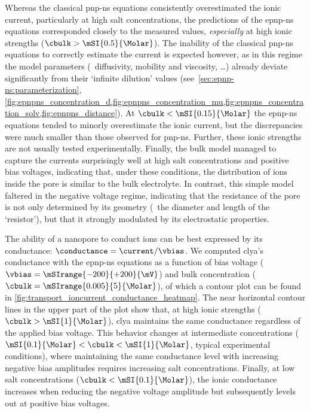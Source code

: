 Whereas the classical \gls{pnp-ns} equations consistently overestimated the ionic current, particularly at
high salt concentrations, the predictions of the \gls{epnp-ns} equations corresponded closely to the measured
values, \emph{especially} at high ionic strengths ($\cbulk > \mSI{0.5}{\Molar}$). The inability of the
classical \gls{pnp-ns} equations to correctly estimate the current is expected however, as in this regime the
model parameters (\eg~diffusivity, mobility and viscosity, \ldots) already deviate significantly from their
`infinite dilution' values (see~\cref{sec:epnp-ns:parameterization},
\cref{fig:epnpns_concentration_d,fig:epnpns_concentration_mu,fig:epnpns_concentration_solv,fig:epnpns_distance}).
At $\cbulk < \mSI{0.15}{\Molar}$ the \gls{epnp-ns} equations tended to minorly overestimate the ionic current,
but the discrepancies were much smaller than those observed for \gls{pnp-ns}. Further, these ionic strengths
are not usually tested experimentally. Finally, the bulk model managed to capture the currents surprisingly
well at high salt concentrations and positive bias voltages, indicating that, under these conditions, the
distribution of ions inside the pore is similar to the bulk electrolyte. In contrast, this simple model
faltered in the negative voltage regime, indicating that the resistance of the pore is not only determined by
its geometry (\ie~the diameter and length of the `resistor'), but that it strongly modulated by its
electrostatic properties.

The ability of a nanopore to conduct ions can be best expressed by its conductance: $\conductance = \current /
\vbias$. We computed \gls{clya}'s conductance with the \gls{epnp-ns} equations as a function of bias voltage
($\vbias = \mSIrange{-200}{+200}{\mV}$) and bulk  concentration ($\cbulk =
\mSIrange{0.005}{5}{\Molar}$), of which a contour plot can be found in
\cref{fig:transport_ioncurrent_conductance_heatmap}. The near horizontal contour lines in the upper part of
the plot show that, at high ionic strengths ($\cbulk > \mSI{1}{\Molar}$), \gls{clya} maintains the same
conductance regardless of the applied bias voltage. This behavior changes at intermediate concentrations
($\mSI{0.1}{\Molar} < \cbulk < \mSI{1}{\Molar}$, typical experimental conditions), where maintaining the same
conductance level with increasing negative bias amplitudes requires increasing salt concentrations. Finally,
at low salt concentrations ($\cbulk < \mSI{0.1}{\Molar}$), the ionic conductance increases when reducing the
negative voltage amplitude but subsequently levels out at positive bias voltages.

